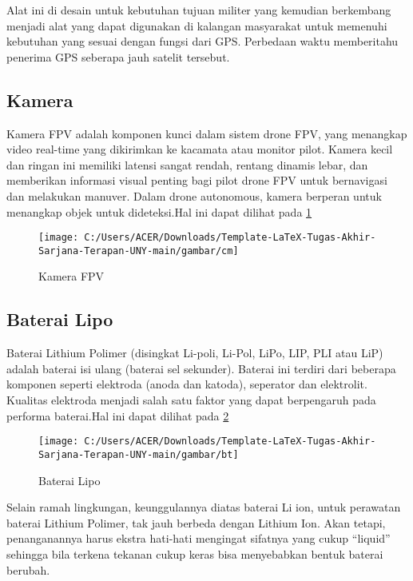 Alat ini di desain untuk kebutuhan tujuan militer yang kemudian berkembang menjadi alat yang dapat digunakan di kalangan masyarakat untuk memenuhi kebutuhan yang sesuai dengan fungsi dari GPS. Perbedaan waktu memberitahu penerima GPS seberapa jauh satelit tersebut.

\subsection{Kamera}
Kamera FPV adalah komponen kunci dalam sistem drone FPV, yang menangkap video real-time yang dikirimkan ke kacamata atau monitor pilot\cite{fauyan2023perancangan}. Kamera kecil dan ringan ini memiliki latensi sangat rendah, rentang dinamis lebar, dan memberikan informasi visual penting bagi pilot drone FPV untuk bernavigasi dan melakukan manuver. Dalam drone autonomous, kamera berperan untuk menangkap objek untuk dideteksi.Hal ini dapat dilihat pada \cref{fig:cm}

\begin{figure}[H]
	\centering
	\texttt{[image: C:/Users/ACER/Downloads/Template-LaTeX-Tugas-Akhir-Sarjana-Terapan-UNY-main/gambar/cm]}
	\caption{Kamera FPV}
	\label{fig:cm}
\end{figure}


\subsection{Baterai Lipo}
Baterai Lithium Polimer (disingkat Li-poli, Li-Pol, LiPo, LIP, PLI atau LiP) adalah baterai isi ulang (baterai sel sekunder). Baterai ini terdiri dari beberapa komponen seperti elektroda (anoda dan katoda), seperator dan elektrolit. Kualitas elektroda menjadi salah satu faktor yang dapat berpengaruh pada performa baterai\cite{hanif2023pengaruh}.Hal ini dapat dilihat pada \cref{fig:bt}

\begin{figure}[H]
	\centering
	\texttt{[image: C:/Users/ACER/Downloads/Template-LaTeX-Tugas-Akhir-Sarjana-Terapan-UNY-main/gambar/bt]}
	\caption{Baterai Lipo}
	\label{fig:bt}
\end{figure}


Selain ramah lingkungan, keunggulannya diatas baterai Li ion, untuk perawatan baterai Lithium Polimer, tak jauh berbeda dengan Lithium Ion. Akan tetapi, penanganannya harus ekstra hati-hati mengingat sifatnya yang cukup “liquid” sehingga bila terkena tekanan cukup keras bisa menyebabkan bentuk baterai berubah.

